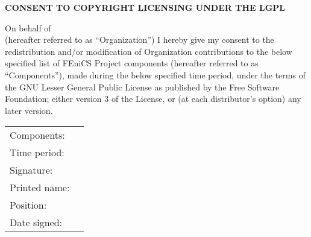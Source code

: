 \documentclass[11pt]{article}
\begin{document}
\pagestyle{empty}

\large

\begin{center}
  \textbf{CONSENT TO COPYRIGHT LICENSING UNDER THE LGPL}
\end{center}

\normalsize

\vspace{1cm}

On behalf of \underline{\hspace{12.5cm}} \\ (hereafter referred to as
``Organization'') I hereby give my consent to the redistribution
and/or modification of Organization contributions to the below
specified list of FEniCS Project components (hereafter referred to as
``Components''), made during the below specified time period, under
the terms of the GNU Lesser General Public License as published by the
Free Software Foundation; either version 3 of the License, or (at each
distributor's option) any later version.

\bigskip
\bigskip

\begin{tabular}{ll}
  Components:  & \underline{\hspace{9cm}}   \\[1.5cm]
  Time period: & \underline{\hspace{9cm}}   \\[3cm]
  Signature:     & \underline{\hspace{9cm}} \\[1.5cm]
  Printed name:  & \underline{\hspace{9cm}} \\[1.5cm]
  Position:      & \underline{\hspace{9cm}} \\[1.5cm]
  Date signed:   & \underline{\hspace{9cm}}
\end{tabular}
\end{document}
